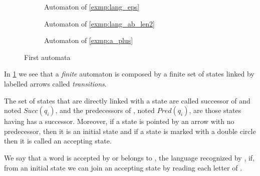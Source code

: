 \begin{figure}[H]
  \centering
  \begin{subfigure}[b]{0.45\textwidth}
    \centering
    \caption{Automaton of \cref{exmp:lang_eps}}
  \end{subfigure}
  \begin{subfigure}[b]{0.45\textwidth}
    \centering
    \caption{Automaton of \cref{exmp:lang_ab_len2}}
  \end{subfigure}
  \begin{subfigure}[b]{0.45\textwidth}
    \centering
    \caption{Automaton of \cref{exmp:a_plus}}
  \end{subfigure}
  \caption{First automata}
  \label{simple_automata}
\end{figure}

In \cref{simple_automata} we see that a \textit{finite} automaton is composed by a finite set of states linked by labelled arrows called \textit{transitions}.

The set of states that are directly linked with a state \qi{} are called successor of \qi{} and noted $Succ(q_i)$, and the predecessors of \qi{}, noted $Pred(q_i)$, are those states having \qi{} has a successor. Moreover, if a state is pointed by an arrow with no predecessor, then it is an initial state and if a state is marked with a double circle then it is called an accepting state.

We say that a word \word{} is accepted by \automaton{} or belongs to \langA{}, the language recognized by \automaton{}, if, from an initial state we can join an accepting state by reading each letter of \word{}.

